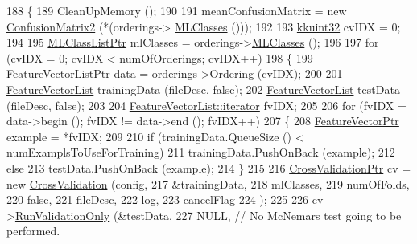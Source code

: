\begin{DoxyCode}
188 \{ 
189   CleanUpMemory ();
190 
191   meanConfusionMatrix = \textcolor{keyword}{new} \hyperlink{class_k_k_m_l_l_1_1_confusion_matrix2}{ConfusionMatrix2} (*(orderings->
      \hyperlink{class_k_k_m_l_l_1_1_orderings_ae62368abdc7b7e28bbe7a9a175e659c4}{MLClasses} ()));
192 
193   \hyperlink{namespace_k_k_b_af8d832f05c54994a1cce25bd5743e19a}{kkuint32}  cvIDX = 0;
194 
195   \hyperlink{class_k_k_m_l_l_1_1_m_l_class_list}{MLClassListPtr}  mlClasses = orderings->\hyperlink{class_k_k_m_l_l_1_1_orderings_ae62368abdc7b7e28bbe7a9a175e659c4}{MLClasses} ();
196 
197   \textcolor{keywordflow}{for}  (cvIDX = 0;  cvIDX < numOfOrderings;  cvIDX++)
198   \{
199     \hyperlink{class_k_k_m_l_l_1_1_feature_vector_list}{FeatureVectorListPtr}  data = orderings->\hyperlink{class_k_k_m_l_l_1_1_orderings_a5c02baa64a2c46b638b1e2e7f93d23ff}{Ordering} (cvIDX);
200 
201     \hyperlink{class_k_k_m_l_l_1_1_feature_vector_list}{FeatureVectorList}  trainingData (fileDesc, \textcolor{keyword}{false});
202     \hyperlink{class_k_k_m_l_l_1_1_feature_vector_list}{FeatureVectorList}  testData     (fileDesc, \textcolor{keyword}{false});
203 
204     \hyperlink{class_k_k_b_1_1_k_k_queue_aa3c2796a726eea468b94132a9fbf2cfe}{FeatureVectorList::iterator}  fvIDX;
205 
206     \textcolor{keywordflow}{for}  (fvIDX = data->begin ();  fvIDX != data->end ();  fvIDX++)
207     \{
208       \hyperlink{class_k_k_m_l_l_1_1_feature_vector}{FeatureVectorPtr} example = *fvIDX;
209 
210       \textcolor{keywordflow}{if}  (trainingData.QueueSize () < numExamplsToUseForTraining)
211         trainingData.PushOnBack (example);
212       \textcolor{keywordflow}{else}
213         testData.PushOnBack (example);
214     \}
215 
216     \hyperlink{class_k_k_m_l_l_1_1_cross_validation}{CrossValidationPtr}  cv = \textcolor{keyword}{new} \hyperlink{class_k_k_m_l_l_1_1_cross_validation}{CrossValidation} (config,
217                                                   &trainingData,
218                                                   mlClasses,
219                                                   numOfFolds,
220                                                   \textcolor{keyword}{false},
221                                                   fileDesc,
222                                                   log,
223                                                   cancelFlag
224                                                  );
225 
226     cv->\hyperlink{class_k_k_m_l_l_1_1_cross_validation_a9178a5da95fc1b9ab10c83444e995f6f}{RunValidationOnly} (&testData, 
227                            NULL,        \textcolor{comment}{// No McNemars test going to be performed.}

\end{DoxyCode}
